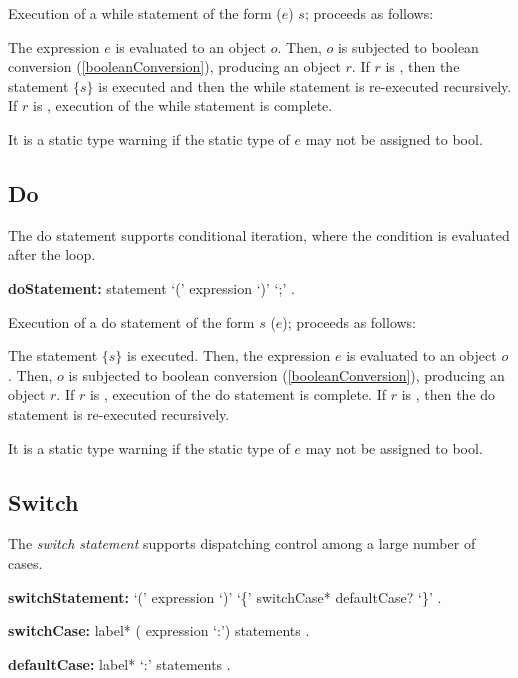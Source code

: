 \documentclass{article}
\newcommand{\code}[1]{{\sf #1}}
\begin{document}
\LMHash{}
 Execution of a while statement of the form \code{\WHILE{} ($e$) $s$;} proceeds as follows: 

\LMHash{}
The expression $e$ is evaluated to an object $o$. Then, $o$ is  subjected to boolean conversion (\ref{booleanConversion}), producing an object $r$.  If $r$ is \TRUE{}, then the statement $\{s\}$ is executed and then the while statement is re-executed recursively. If $r$ is \FALSE{}, execution of the while statement is complete.

\LMHash{}
It is a static type warning if the static type of $e$ may not be assigned to \code{bool}.
    

\subsection{Do}

\LMHash{}
The do statement supports conditional iteration, where the condition is evaluated after the loop.

\begin{grammar}
{\bf doStatement:}
    \DO{} statement \WHILE{} `(' expression `)' `{\escapegrammar ;}'%
      .
 \end{grammar}

    
\LMHash{}
Execution of a do statement of the form \code{\DO{} $s$ \WHILE{} ($e$);} proceeds as follows: 

\LMHash{}
The statement $\{s\}$ is executed. Then, the expression $e$ is evaluated to an object $o$. Then, $o$ is  subjected to boolean conversion (\ref{booleanConversion}), producing an object $r$. If $r$ is \FALSE{}, execution of the do statement is complete. If $r$ is \TRUE{}, then the do statement is re-executed recursively. 

\LMHash{}
It is a static type warning if the static type of $e$ may not be assigned to \code{bool}. 

\subsection{Switch}

\LMHash{}
The {\em switch statement} supports dispatching control among a large number of cases.

 \begin{grammar}
{\bf switchStatement:}
      \SWITCH{} `(' expression `)' `\{' switchCase* defaultCase? `\}'%
    .


{\bf switchCase:}
      label* (\CASE{} expression `{\escapegrammar :}') statements
    .

{\bf defaultCase:}
      label*  \DEFAULT{} `{\escapegrammar :}' statements
    .
 \end{grammar}
 
\end{document}
